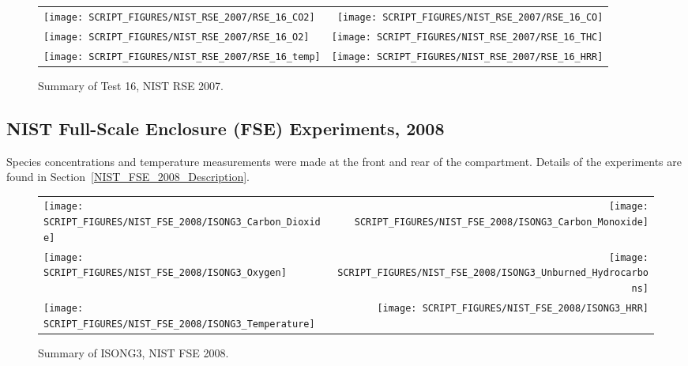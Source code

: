 \begin{figure}[p]
\begin{tabular*}{\textwidth}{l@{\extracolsep{\fill}}r}
\texttt{[image: SCRIPT\_FIGURES/NIST\_RSE\_2007/RSE\_16\_CO2]} &
\texttt{[image: SCRIPT\_FIGURES/NIST\_RSE\_2007/RSE\_16\_CO]} \\
\texttt{[image: SCRIPT\_FIGURES/NIST\_RSE\_2007/RSE\_16\_O2]} &
\texttt{[image: SCRIPT\_FIGURES/NIST\_RSE\_2007/RSE\_16\_THC]} \\
\texttt{[image: SCRIPT\_FIGURES/NIST\_RSE\_2007/RSE\_16\_temp]} &
\texttt{[image: SCRIPT\_FIGURES/NIST\_RSE\_2007/RSE\_16\_HRR]}
\end{tabular*}
\caption[Summary of Test 16, NIST RSE 2007]{Summary of Test 16, NIST RSE 2007.}
\label{NIST_RSE_2007_16}
\end{figure}


\clearpage

\subsection{NIST Full-Scale Enclosure (FSE) Experiments, 2008}
\label{sec:NIST_FSE_2008}

Species concentrations and temperature measurements were made at the front and rear of the compartment. Details of the experiments are found in Section~\ref{NIST_FSE_2008_Description}.

\begin{figure}[!ht]
\begin{tabular*}{\textwidth}{l@{\extracolsep{\fill}}r}
\texttt{[image: SCRIPT\_FIGURES/NIST\_FSE\_2008/ISONG3\_Carbon\_Dioxide]} &
\texttt{[image: SCRIPT\_FIGURES/NIST\_FSE\_2008/ISONG3\_Carbon\_Monoxide]} \\
\texttt{[image: SCRIPT\_FIGURES/NIST\_FSE\_2008/ISONG3\_Oxygen]} &
\texttt{[image: SCRIPT\_FIGURES/NIST\_FSE\_2008/ISONG3\_Unburned\_Hydrocarbons]} \\
\texttt{[image: SCRIPT\_FIGURES/NIST\_FSE\_2008/ISONG3\_Temperature]} &
\texttt{[image: SCRIPT\_FIGURES/NIST\_FSE\_2008/ISONG3\_HRR]}
\end{tabular*}
\caption[Summary of ISONG3, NIST FSE 2008]{Summary of ISONG3, NIST FSE 2008.}
\label{NIST_FSE_1994_ISONG3}
\end{figure}

\newpage

